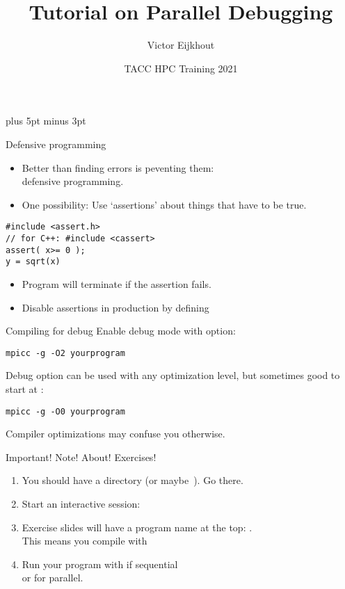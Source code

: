 \documentclass[11pt,headernav]{beamer}
\def\Location{}%
\def\Location{TACC training 2021}
\def\Location{}%
\def\courseyear{2021}
\def\Location{TACC HPC Training \courseyear}
\begin{document}
\parskip=10pt plus 5pt minus 3pt

\title{Tutorial on Parallel Debugging}
\author{Victor Eijkhout}
\date{\Location}

\begin{frame}
  \titlepage
\end{frame}

\begin{frame}[containsverbatim]{Defensive programming}
  \begin{itemize}
  \item
    Better than finding errors is peventing them:\\
    defensive programming.
    \item One possibility:
      Use `assertions' about things that have to be true.
  \end{itemize}

  \lstset{language=C}
\begin{lstlisting}
#include <assert.h>
// for C++: #include <cassert>
assert( x>= 0 );
y = sqrt(x)
\end{lstlisting}

\begin{itemize}
\item
  Program will terminate if the assertion fails.
\item Disable assertions in production by defining 
\end{itemize}

\end{frame}


\begin{frame}[containsverbatim]{Compiling for debug}
Enable debug mode with  option:
\begin{verbatim}
mpicc -g -O2 yourprogram
\end{verbatim}
Debug option can be used with any optimization level, but
sometimes good to start at :
\begin{verbatim}
mpicc -g -O0 yourprogram
\end{verbatim}
Compiler optimizations may confuse you otherwise.
\end{frame}

\begin{frame}[containsverbatim]{Important! Note! About! Exercises!}
  \begin{enumerate}
  \item You should have a directory  (or maybe~).
    Go there.
  \item Start an interactive session: 
  \item Exercise slides will have a program name at the top: \n{[roots]}.\\
    This means you compile with 
  \item Run your program with  if sequential\\
    or  for parallel.
  \end{enumerate}
\end{frame}
\end{document}
